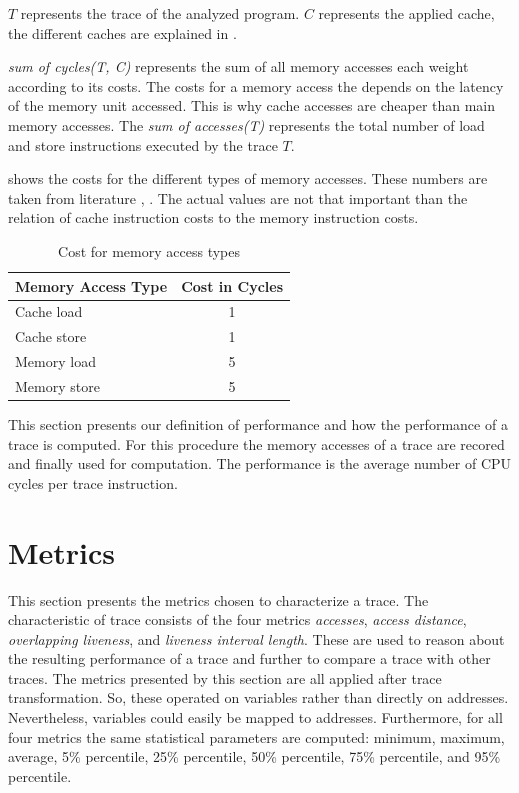\documentclass[onecolumn, openright, master, english, signatures]{dbrgrptt}
\begin{document}
$T$ represents the \ac{trace} of the analyzed program. $C$ represents the applied cache, the different caches are explained in .

\emph{sum of cycles(T, C)} represents the sum of all memory accesses each weight according to its costs. The costs for a memory access the depends on the latency of the memory unit accessed. This is why cache accesses are cheaper than main memory accesses. The \emph{sum of accesses(T)} represents the total number of load and store instructions executed by the \ac{trace} $T$.

 shows the costs for the different types of memory accesses. These numbers are taken from literature \cite{drepper2007every}, \cite{skylake}. The actual values are not that important than the relation of cache instruction costs to the memory instruction costs.

\begin{table}[!ht]
  \centering
  \begin{tabular}{lc}
  \hline
  Memory Access Type & Cost in Cycles \\
  \hline
  Cache  load  & 1 \\
  Cache  store & 1 \\
  Memory load  & 5 \\
  Memory store & 5 \\
  \hline
  \end{tabular}
  \caption{Cost for memory access types}
  \label{tab:memory-access-cost}
\end{table}

This section presents our definition of performance and how the performance of a trace is computed. For this procedure the memory accesses of a  \ac{trace} are recored and finally used for computation. The performance is the average number of \ac{CPU} cycles per \ac{trace} instruction.


\section{Metrics}\label{sec:metrics}

This section presents the metrics chosen to characterize a \ac{trace}. The characteristic of \ac{trace} consists of the four metrics \emph{accesses}, \emph{access distance}, \emph{overlapping liveness}, and \emph{liveness interval length}. These are used to reason about the resulting performance of a \ac{trace} and further to compare a \ac{trace} with other \ac{trace}s. The metrics presented by this section are all applied after \ac{trace} transformation. So, these operated on variables rather than directly on addresses. Nevertheless, variables could easily be mapped to addresses. Furthermore, for all four metrics the same statistical parameters are computed: minimum, maximum, average, 5\% percentile, 25\% percentile, 50\% percentile, 75\% percentile, and 95\% percentile.
\end{document}
